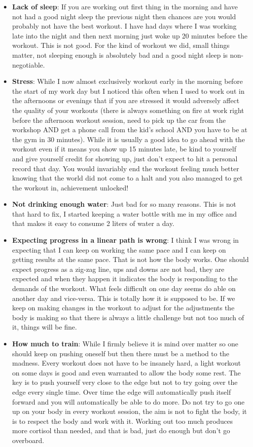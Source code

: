 \documentclass[
  oneside]{book}
\begin{document}
\begin{itemize}
\item
  \textbf{Lack of sleep}: If you are working out first thing in the morning and have not had a good night sleep the previous night then chances are you would probably not have the best workout. I have had days where I was working late into the night and then next morning just woke up 20 minutes before the workout. This is not good. For the kind of workout we did, small things matter, not sleeping enough is absolutely bad and a good night sleep is non-negotiable.
\item
  \textbf{Stress}: While I now almost exclusively workout early in the morning before the start of my work day but I noticed this often when I used to work out in the afternoons or evenings that if you are stressed it would adversely affect the quality of your workouts (there is always something on fire at work right before the afternoon workout session, need to pick up the car from the workshop AND get a phone call from the kid's school AND you have to be at the gym in 30 minutes). While it is usually a good idea to go ahead with the workout even if it means you show up 15 minutes late, be kind to yourself and give yourself credit for showing up, just don't expect to hit a personal record that day. You would invariably end the workout feeling much better knowing that the world did not come to a halt and you also managed to get the workout in, achievement unlocked!
\item
  \textbf{Not drinking enough water}: Just bad for so many reasons. This is not that hard to fix, I started keeping a water bottle with me in my office and that makes it easy to consume 2 liters of water a day.
\item
  \textbf{Expecting progress in a linear path is wrong}: I think I was wrong in expecting that I can keep on working the same pace and I can keep on getting results at the same pace. That is not how the body works. One should expect progress as a zig-zag line, ups and downs are not bad, they are expected and when they happen it indicates the body is responding to the demands of the workout. What feels difficult on one day seems do able on another day and vice-versa. This is totally how it is supposed to be. If we keep on making changes in the workout to adjust for the adjustments the body is making so that there is always a little challenge but not too much of it, things will be fine.
\item
  \textbf{How much to train}: While I firmly believe it is mind over matter so one should keep on pushing oneself but then there must be a method to the madness. Every workout does not have to be insanely hard, a light workout on some days is good and even warranted to allow the body some rest. The key is to push yourself very close to the edge but not to try going over the edge every single time. Over time the edge will automatically push itself forward and you will automatically be able to do more. Do not try to go one up on your body in every workout session, the aim is not to fight the body, it is to respect the body and work with it. Working out too much produces more cortisol than needed, and that is bad, just do enough but don't go overboard.
\end{itemize}
\end{document}
